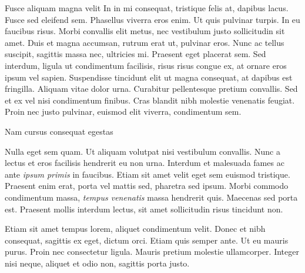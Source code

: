 \begin{frame}[t]
\begin{columns}[t]
\begin{column}{\colwidth}
\begin{block}{Fusce aliquam magna velit}
    In in mi consequat, tristique felis at, dapibus lacus. Fusce sed eleifend
    sem. Phasellus viverra eros enim. Ut quis pulvinar turpis. In eu faucibus
    risus. Morbi convallis elit metus, nec vestibulum justo sollicitudin sit
    amet. Duis et magna accumsan, rutrum erat ut, pulvinar eros. Nunc ac tellus
    suscipit, sagittis massa nec, ultricies mi. Praesent eget placerat sem. Sed
    interdum, ligula ut condimentum facilisis, risus risus congue ex, at ornare
    eros ipsum vel sapien. Suspendisse tincidunt elit ut magna consequat, at
    dapibus est fringilla. Aliquam vitae dolor urna. Curabitur pellentesque
    pretium convallis. Sed et ex vel nisi condimentum finibus. Cras blandit
    nibh molestie venenatis feugiat. Proin nec justo pulvinar, euismod elit
    viverra, condimentum sem.

  \end{block}

  \begin{block}{Nam cursus consequat egestas}

    Nulla eget sem quam. Ut aliquam volutpat nisi vestibulum convallis. Nunc a
    lectus et eros facilisis hendrerit eu non urna. Interdum et malesuada fames
    ac ante \textit{ipsum primis} in faucibus. Etiam sit amet velit eget sem
    euismod tristique. Praesent enim erat, porta vel mattis sed, pharetra sed
    ipsum. Morbi commodo condimentum massa, \textit{tempus venenatis} massa
    hendrerit quis. Maecenas sed porta est. Praesent mollis interdum lectus,
    sit amet sollicitudin risus tincidunt non.

    Etiam sit amet tempus lorem, aliquet condimentum velit. Donec et nibh
    consequat, sagittis ex eget, dictum orci. Etiam quis semper ante. Ut eu
    mauris purus. Proin nec consectetur ligula. Mauris pretium molestie
    ullamcorper. Integer nisi neque, aliquet et odio non, sagittis porta justo.


\end{block}
\end{column}
\end{columns}
\end{frame}
